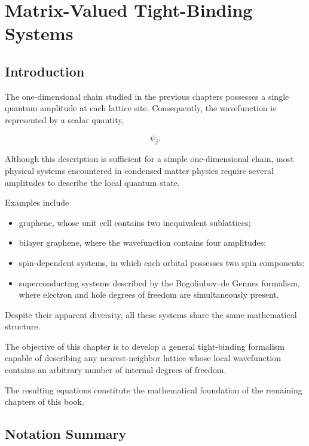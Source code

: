 \chapter{Matrix-Valued Tight-Binding Systems}

\section{Introduction}

The one-dimensional chain studied in the previous chapters possesses a
single quantum amplitude at each lattice site. Consequently, the
wavefunction is represented by a scalar quantity,

\[
	\psi_j.
\]

Although this description is sufficient for a simple one-dimensional
chain, most physical systems encountered in condensed matter physics
require several amplitudes to describe the local quantum state.

Examples include

\begin{itemize}

	\item graphene, whose unit cell contains two inequivalent sublattices;

	\item bilayer graphene, where the wavefunction contains four amplitudes;

	\item spin-dependent systems, in which each orbital possesses two spin
	      components;

	\item superconducting systems described by the
	      Bogoliubov--de Gennes formalism, where electron and hole degrees of
	      freedom are simultaneously present.

\end{itemize}

Despite their apparent diversity, all these systems share the same
mathematical structure.

The objective of this chapter is to develop a general tight-binding
formalism capable of describing any nearest-neighbor lattice whose local
wavefunction contains an arbitrary number of internal degrees of
freedom.

The resulting equations constitute the mathematical foundation of the
remaining chapters of this book.

\section*{Notation Summary}

